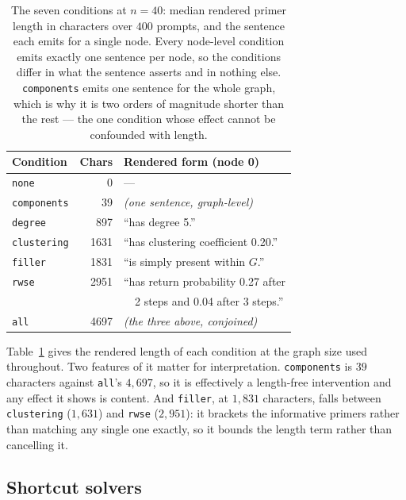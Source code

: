\documentclass[11pt]{article}
\begin{document}
\begin{table}[t]
\centering
\footnotesize
\setlength{\tabcolsep}{4pt}
\begin{tabular}{lrl}
\toprule
Condition & Chars & Rendered form (node 0) \\
\midrule
\texttt{none}       &    0 & --- \\
\texttt{components} &   39 & \emph{(one sentence, graph-level)} \\
\texttt{degree}     &  897 & ``has degree 5.'' \\
\texttt{clustering} & 1631 & ``has clustering coefficient 0.20.'' \\
\texttt{filler}     & 1831 & ``is simply present within $G$.'' \\
\texttt{rwse}       & 2951 & ``has return probability 0.27 after \\
                    &      & ~~2 steps and 0.04 after 3 steps.'' \\
\texttt{all}        & 4697 & \emph{(the three above, conjoined)} \\
\bottomrule
\end{tabular}
\caption{The seven conditions at $n{=}40$: median rendered primer length in
characters over $400$ prompts, and the sentence each emits for a single
node. Every node-level condition emits exactly one sentence per node, so
the conditions differ in what the sentence asserts and in nothing else.
\texttt{components} emits one sentence for the whole graph, which is why it
is two orders of magnitude shorter than the rest --- the one condition
whose effect cannot be confounded with length.}
\label{tab:lengths}
\end{table}

Table~\ref{tab:lengths} gives the rendered length of each condition at the
graph size used throughout. Two features of it matter for interpretation.
\texttt{components} is $39$ characters against \texttt{all}'s $4{,}697$, so
it is effectively a length-free intervention and any effect it shows is
content. And \texttt{filler}, at $1{,}831$ characters, falls between
\texttt{clustering} ($1{,}631$) and \texttt{rwse} ($2{,}951$): it brackets
the informative primers rather than matching any single one exactly, so it
bounds the length term rather than cancelling it.

\subsection{Shortcut solvers}
\label{sec:shortcuts}
\end{document}
